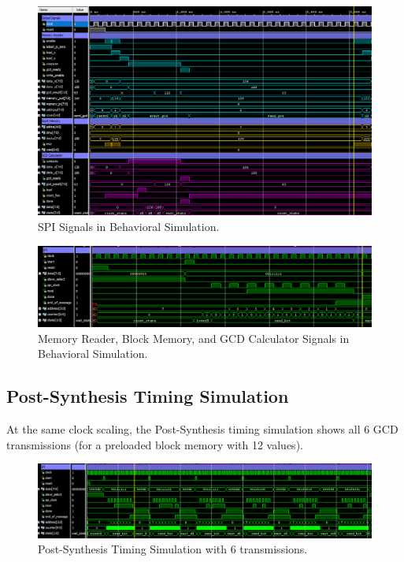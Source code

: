 \documentclass[a4paper, 12pt]{article}
\begin{document}
\begin{landscape}
\begin{figure}[H]
\centering
\includegraphics[width=0.80\paperheight, keepaspectratio=true]{Sources/behav-half-spi-1.PNG}
\caption{SPI Signals in Behavioral Simulation.}
\label{fig:behav-sim1}
\end{figure}

\begin{figure}[H]
\centering
\includegraphics[width=0.85\paperheight, keepaspectratio=true]{Sources/behav-half-spi-2.PNG}
\caption{Memory Reader, Block Memory, and GCD Calculator Signals in Behavioral Simulation.}
\label{fig:behav-sim2}
\end{figure}

\subsection{Post-Synthesis Timing Simulation}
At the same clock scaling, the Post-Synthesis timing simulation shows all 6 GCD transmissions (for a preloaded block memory with 12 values).

\begin{figure}[H]
\centering
\includegraphics[width=0.85\paperheight, keepaspectratio=true]{Sources/all-spi-synth.PNG}
\caption{Post-Synthesis Timing Simulation with 6 transmissions.}
\label{fig:post-synth-sim}
\end{figure}


\end{landscape}
\end{document}
